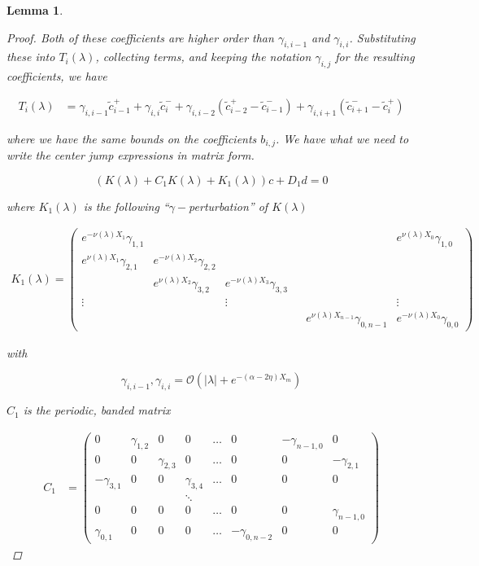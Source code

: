 \documentclass[12pt]{article}
\newtheorem{lemma}{Lemma}
\begin{document}
\begin{lemma}
\begin{proof}
Both of these coefficients are higher order than $\gamma_{i,i-1}$ and $\gamma_{i,i}$. Substituting these into $T_i(\lambda)$, collecting terms, and keeping the notation $\gamma_{i,j}$ for the resulting coefficients, we have

\begin{align*}
T_i(\lambda) &= \gamma_{i,i-1} \tilde{c}_{i-1}^+ + \gamma_{i,i} \tilde{c}_{i}^- + \gamma_{i,i-2} ( \tilde{c}_{i-2}^+ - \tilde{c}_{i-1}^-) + \gamma_{i,i+1} (\tilde{c}_{i+1}^- - \tilde{c}_i^+)
\end{align*}

where we have the same bounds on the coefficients $b_{i,j}$. We have what we need to write the center jump expressions in matrix form.

\[
(K(\lambda) + C_1 K(\lambda) + K_1(\lambda)) c + D_1 d = 0
\]

where $K_1(\lambda)$ is the following ``$\gamma-$perturbation'' of $K(\lambda)$ 

\begin{align*}
K_1(\lambda) =  
\begin{pmatrix}
e^{-\nu(\lambda)X_1} \gamma_{1,1} & & & & & e^{\nu(\lambda)X_0}\gamma_{1,0} \\
e^{\nu(\lambda)X_1}\gamma_{2,1} & e^{-\nu(\lambda)X_2}\gamma_{2,2} \\
& e^{\nu(\lambda)X_2}\gamma_{3,2} & e^{-\nu(\lambda)X_3}\gamma_{3,3} \\
\vdots & & \vdots & &&  \vdots \\
& & & & e^{\nu(\lambda)X_{n-1}}\gamma_{0,n-1} & e^{-\nu(\lambda)X_0}\gamma_{0,0} 
\end{pmatrix}
\end{align*}

with 

\[
\gamma_{i,i-1}, \gamma_{i,i} = \mathcal{O}(|\lambda| + e^{-(\alpha - 2 \eta) X_m})
\] 

$C_1$ is the periodic, banded matrix

\begin{align*}
C_1 &= \begin{pmatrix}
0 & \gamma_{1,2} & 0 & 0 & \dots & 0 & -\gamma_{n-1,0} & 0 \\
0 & 0 & \gamma_{2,3} & 0 & \dots & 0 & 0 & -\gamma_{2,1} \\
-\gamma_{3,1} & 0 & 0 & \gamma_{3,4} & \dots & 0 & 0 & 0 \\
&  & & \ddots  \\
0 & 0 & 0 & 0 & \dots & 0 & 0 & \gamma_{n-1,0} \\
\gamma_{0,1} & 0 & 0 & 0 & \dots & -\gamma_{0, n-2} & 0 & 0 
\end{pmatrix}
\end{align*}


\end{proof}
\end{lemma}
\end{document}
